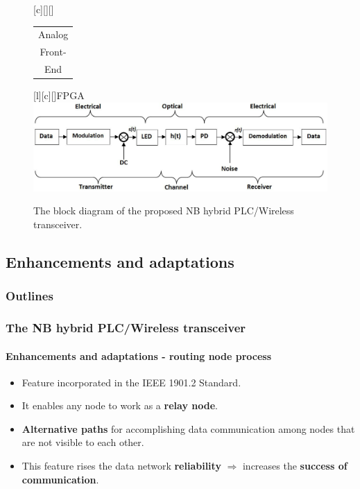 \documentclass[mathserif]{beamer}
\newcommand{\wait}{\vfill}
\begin{document}
\begin{frame}
\begin{figure}[htb]
		[c][][\sizeLetter]{\begin{tabular}{@{}c@{}}
				Analog\\ 
				Front-\\ 
				End \\ 
		\end{tabular} }
		[\sizeLetter]{FPGA}
		\includegraphics[width=\textwidth]{figuras/block_diagram}
		\caption{The block diagram of the proposed NB hybrid PLC/Wireless transceiver.}
		\label{fig:blockdiagram}
	\end{figure}
\end{frame}

\subsection{Enhancements and adaptations}
\begin{frame}
\frametitle{Outlines}
\small
\tableofcontents[currentsubsection]
\end{frame}

\begin{frame}
	\frametitle{The NB hybrid PLC/Wireless transceiver}
	\framesubtitle{Enhancements and adaptations - routing node process}
	\begin{itemize}
		\item Feature incorporated in the IEEE 1901.2 Standard. \wait
		\item It enables any node to work as a \textbf{relay node}. \wait
		\item \textbf{Alternative paths} for accomplishing data communication among nodes that are	not visible to each other. \wait
		\item This feature rises the data network \textbf{reliability} $\Rightarrow$ increases the \textbf{success of communication}.
	\end{itemize}
\end{frame}
\end{document}
